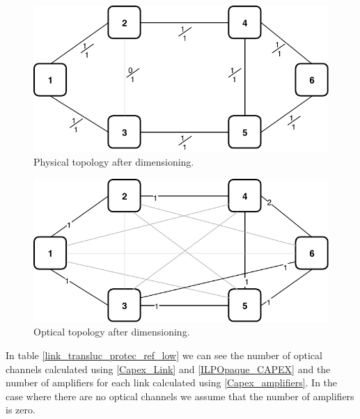 \begin{figure}[h!]
\centering
\includegraphics[width=12cm]{sdf/ilp/translucent_protection/figures/physical_topology_low}
\caption{Physical topology after dimensioning.}
\label{physical3_protectionlow}
\end{figure}
\newpage
\begin{figure}[h!]
\centering
\includegraphics[width=12cm]{sdf/ilp/translucent_protection/figures/optical_topology_low}
\caption{Optical topology after dimensioning.}
\label{optical3_protectionlow}
\end{figure}

\vspace{15pt}
In table \ref{link_transluc_protec_ref_low} we can see the number of optical channels calculated using \ref{Capex_Link} and \ref{ILPOpaque_CAPEX} and the number of amplifiers for each link calculated using \ref{Capex_amplifiers}. In the case where there are no optical channels we assume that the number of amplifiers is zero.\\


